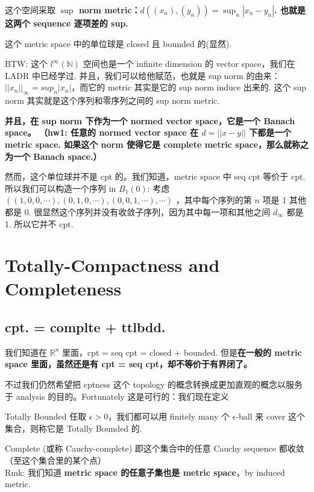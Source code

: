 这个空间采取\textbf{ $\sup$ norm metric：$d((x_n), (y_n)) = \sup_{n} |x_n - y_n| $. 也就是这两个 sequence 逐项差的 sup.}

这个 metric space 中的单位球是 closed 且 bounded 的(显然).  

BTW: 这个 $l^{\infty}(\mathbb{N})$ 空间也是一个 infinite dimension 的 vector space，我们在 LADR 中已经学过. 并且，我们可以给他赋范，也就是 sup norm 的由来：\textbf{$||x_n||_{\infty} = sup_{n}|x_n|$}，而它的 metric 其实是它的 sup norm induce 出来的. 这个 sup norm 其实就是这个序列和零序列之间的 sup norm metric. 

\textbf{并且，在 sup norm 下作为一个 normed vector space，它是一个 Banach space。
（hw1: 任意的 normed vector space 在 $d =  ||x-y||$ 下都是一个 metric space. 如果这个 norm 使得它是 complete metric space，那么就称之为一个 Banach space.）}

然而，这个单位球并不是 cpt 的。我们知道，metric space 中 seq cpt 等价于 cpt. 所以我们可以构造一个序列 in $B_1(0)$: 考虑 $((1,0,0,\cdots), (0,1,0,\cdots),(0,0,1,\cdots),\cdots)$ ，其中每个序列的第 $n$ 项是 1 其他都是 0. 很显然这个序列并没有收敛子序列，因为其中每一项和其他之间 $d_{\infty}$ 都是1. 所以它并不 cpt.


\section{Totally-Compactness and Completeness}
\subsection{cpt. = complte + ttlbdd.}
我们知道在 $\mathbb{R}^n$ 里面，cpt = seq cpt = closed + bounded.
但是\textbf{在一般的 metric space 里面，虽然还是有 cpt = seq cpt，却不等价于有界闭了。}

不过我们仍然希望把 cptness 这个 topology 的概念转换成更加直观的概念以服务于 analysis 的目的。Fortunately 这是可行的：我们现在定义

\begin{definition}{Totally Bounded} \label{ttlbdd}
    任取 $\epsilon > 0$，我们都可以用 finitely many 个 $\epsilon$-ball 来 cover 这个集合，则称它是 Totally Bounded 的.
\end{definition}

\begin{definition}{Complete (或称 Cauchy-complete)} \label{cplt}
    即这个集合中的任意 Cauchy sequence 都收敛（至这个集合里的某个点）
    \\Rmk: 我们知道 \textbf{metric space 的任意子集也是 metric space}，by induced metric.
\end{definition}

